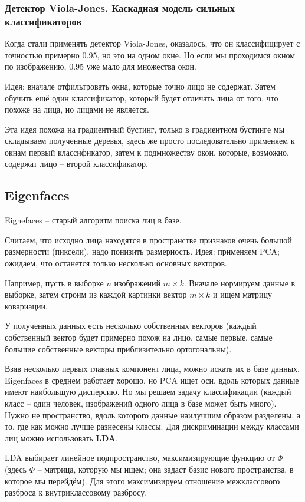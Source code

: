 \documentclass[main.tex]{subfiles}
\begin{document}
\subsubsection{Детектор Viola-Jones. Каскадная модель сильных классификаторов}

Когда стали применять детектор Viola-Jones, оказалось, что он классифицирует с точностью примерно 0.95, но это на одном окне.
Но если мы проходимся окном по изображению, 0.95 уже мало для множества окон.

Идея: вначале отфильтровать окна, которые точно лицо не содержат.
Затем обучить ещё один классификатор, который будет отличать лица от того, что похоже на лица, но лицами не является.

Эта идея похожа на градиентный бустинг, только в градиентном бустинге мы складываем полученные деревья, здесь же просто последовательно применяем к окнам первый классификатор, затем к подмножеству окон, которые, возможно, содержат лицо -- второй классификатор.

\subsection{Eigenfaces}

Eignefaces -- старый алгоритм поиска лиц в базе.

Считаем, что исходно лица находятся в пространстве признаков очень большой размерности (пиксели), надо понизить размерность.
Идея: применяем PCA; ожидаем, что останется только несколько основных векторов.

Например, пусть в выборке $ n $ изображений $ m \times k $.
Вначале нормируем данные в выборке, затем строим из каждой картинки вектор $ m \times k $ и ищем матрицу ковариации.

У полученных данных есть несколько собственных векторов (каждый собственный вектор будет примерно похож на лицо, самые первые, самые большие собственные векторы приблизительно ортогональны).

Взяв несколько первых главных компонент лица, можно искать их в базе данных. \\

Eigenfaces в среднем работает хорошо, но PCA ищет оси, вдоль которых данные имеют наибольшую дисперсию.
Но мы решаем задачу классификации (каждый класс -- один человек, изображений одного лица в базе может быть много).
Нужно не пространство, вдоль которого данные наилучшим образом разделены, а то, где как можно лучше разнесены классы.
Для дискриминации между классами лиц можно использовать \textbf{LDA}.

LDA выбирает линейное подпространство, максимизирующие функцию от $ \Phi $ (здесь $ \Phi $ -- матрица, которую мы ищем; она задаст базис нового пространства, в которое мы перейдём).
Для этого максимизируем отношение межклассового разброса к внутриклассовому разбросу.
	
\end{document}

